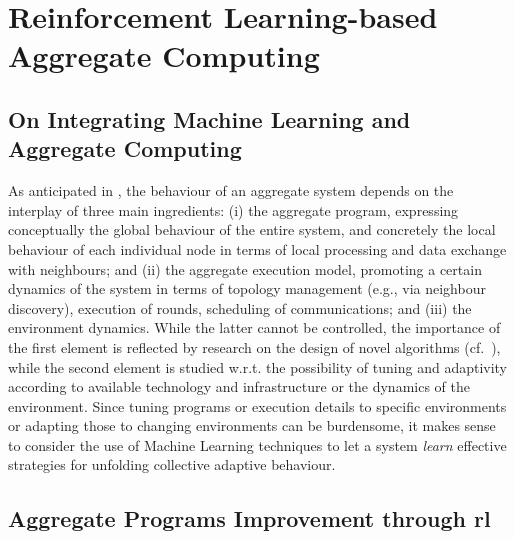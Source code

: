\section{Reinforcement Learning-based Aggregate Computing}\label{s:contrib}

\subsection{On Integrating Machine Learning and Aggregate Computing}

As anticipated in , the behaviour of an aggregate system depends on the interplay of three main ingredients:
 (i) the aggregate program, expressing conceptually the global behaviour of the entire system, and concretely the local behaviour of each individual node in terms of local processing and data exchange with neighbours; and 
 (ii) the aggregate execution model, promoting a certain dynamics of the system in terms of topology management (e.g., via neighbour discovery), execution of rounds, scheduling of communications; and
 (iii) the environment dynamics.
%
While the latter cannot be controlled, 
 the importance of the first element is reflected by research
 on the design of novel algorithms (cf.~\cite{DBLP:journals/jlap/ViroliBDACP19,DBLP:conf/saso/AudritoCDV17}),
 while the second element is studied 
 w.r.t. the possibility of tuning and adaptivity 
 according to 
 available technology and infrastructure 
 or the dynamics of the environment. %
%
Since tuning programs or execution details to specific environments
 or adapting those to changing environments
 can be burdensome,
 it makes sense to consider the use of Machine Learning techniques
 to let a system \emph{learn} effective strategies for unfolding collective adaptive behaviour.
%

\subsection{Aggregate Programs Improvement through \ac{rl}}


